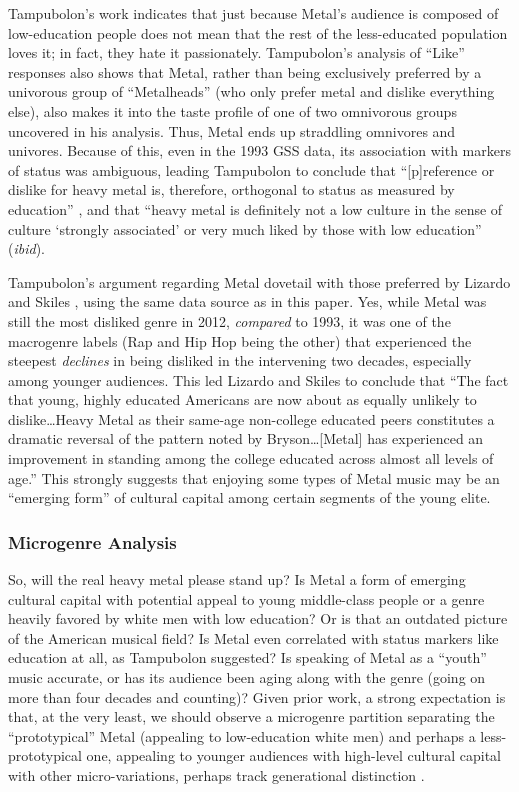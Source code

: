 \documentclass[a4paper,12pt]{extarticle}
\begin{document}
Tampubolon's work indicates that just because Metal's audience is composed of low-education people does not mean that the rest of the less-educated population loves it; in fact, they hate it passionately. Tampubolon's analysis of ``Like'' responses also shows that Metal, rather than being exclusively preferred by a univorous group of ``Metalheads'' (who only prefer metal and dislike everything else), also makes it into the taste profile of one of two omnivorous groups uncovered in his analysis. Thus, Metal ends up straddling omnivores and univores. Because of this, even in the 1993 GSS data, its association with markers of status was ambiguous, leading Tampubolon to conclude that ``[p]reference or dislike for heavy metal is, therefore, orthogonal to status as measured by education'' \citeyearpar[][257]{tampubolon2008revisiting}, and that ``heavy metal is definitely not a low culture in the sense of culture `strongly associated' or very much liked by those with low education'' (\textit{ibid}).

Tampubolon's argument regarding Metal dovetail with those preferred by Lizardo and Skiles \citeyearpar{lizardo_skiles15}, using the same data source as in this paper. Yes, while Metal was still the most disliked genre in 2012, \textit{compared} to 1993, it was one of the macrogenre labels (Rap and Hip Hop being the other) that experienced the steepest \textit{declines} in being disliked in the intervening two decades, especially among younger audiences. This led Lizardo and Skiles \citeyearpar[][18]{lizardo_skiles15} to conclude that ``The fact that young, highly educated Americans are now about as equally unlikely to dislike\ldots Heavy Metal as their same-age non-college educated peers constitutes a dramatic reversal of the pattern noted by Bryson\ldots [Metal] has experienced an improvement in standing among the college educated across almost all levels of age.'' This strongly suggests that enjoying some types of Metal music may be an ``emerging form'' of cultural capital \cite{prieur2013emerging} among certain segments of the young elite.  

\subsubsection{Microgenre Analysis}
So, will the real heavy metal please stand up? Is Metal a form of emerging cultural capital with potential appeal to young middle-class people or a genre heavily favored by white men with low education? Or is that an outdated picture of the American musical field? Is Metal even correlated with status markers like education at all, as Tampubolon suggested? Is speaking of Metal as a ``youth'' music accurate, or has its audience been aging along with the genre (going on more than four decades and counting)? Given prior work, a strong expectation is that, at the very least, we should observe a microgenre partition separating the ``prototypical'' Metal (appealing to low-education white men) and perhaps a less-prototypical one, appealing to younger audiences with high-level cultural capital with other micro-variations, perhaps track generational distinction \citep{lizardo_skiles15}.
\end{document}
